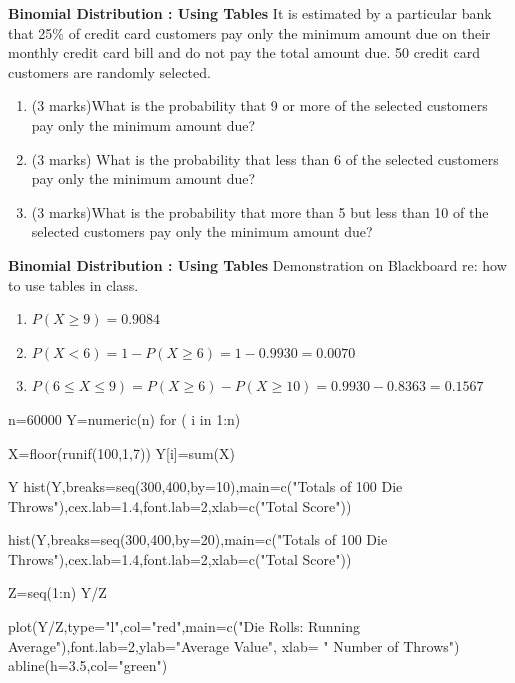 {
\textbf{Binomial Distribution : Using Tables}
It is estimated by a particular bank that 25\% of credit card customers pay only the minimum amount due on their monthly credit card bill and do not pay the total amount due. 50 credit card customers are randomly selected.
\begin{enumerate}
\item  (3 marks)What is the probability that 9 or more of the selected customers pay only the minimum amount due?
\item  (3 marks) What is the probability that less than 6 of the selected customers pay only the minimum amount due?
\item  (3 marks)What is the probability that more than 5 but less than 10 of the selected customers pay only the minimum amount due?
\end{enumerate}

}

{
\textbf{Binomial Distribution : Using Tables}
Demonstration on Blackboard re: how to use tables in class.
\begin{enumerate}
\item  $P(X \geq 9) = 0.9084$
\item  $P(X < 6) = 1- P(X \geq 6) =1 - 0.9930 = 0.0070$
\item  $P(6 \leq X \leq 9) = P(X \geq 6) - P(X \geq 10) = 0.9930 - 0.8363 = 0.1567$
\end{enumerate}

}







n=60000
Y=numeric(n)
for ( i in 1:n){

X=floor(runif(100,1,7))
Y[i]=sum(X)
}

Y
hist(Y,breaks=seq(300,400,by=10),main=c("Totals of 100 Die Throws"),cex.lab=1.4,font.lab=2,xlab=c("Total Score"))

hist(Y,breaks=seq(300,400,by=20),main=c("Totals of 100 Die Throws"),cex.lab=1.4,font.lab=2,xlab=c("Total Score"))



Z=seq(1:n)
Y/Z

plot(Y/Z,type="l",col="red",main=c("Die Rolls: Running Average"),font.lab=2,ylab="Average Value", xlab=
" Number of Throws")
abline(h=3.5,col="green")



